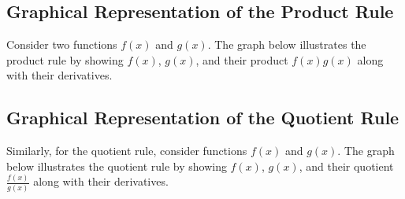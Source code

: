 \documentclass[a4paper,12pt]{book}
\newcounter{example}
\begin{document}
\subsection{Graphical Representation of the Product Rule}
Consider two functions \( f(x) \) and \( g(x) \). The graph below illustrates the product rule by showing \( f(x) \), \( g(x) \), and their product \( f(x)g(x) \) along with their derivatives.


\begin{center}
\end{center}

\subsection{Graphical Representation of the Quotient Rule}
Similarly, for the quotient rule, consider functions \( f(x) \) and \( g(x) \). The graph below illustrates the quotient rule by showing \( f(x) \), \( g(x) \), and their quotient \( \frac{f(x)}{g(x)} \) along with their derivatives.

\end{document}
